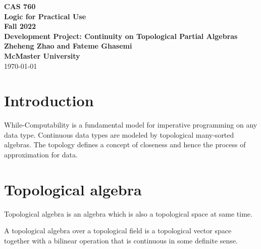 \documentclass[11pt,fleqn]{article}
\begin{document}
\thispagestyle{empty}

\bc
  {\large \textbf{CAS 760}}\\[2mm]
  {\large \textbf{Logic for Practical Use}}\\[2mm]
  {\large \textbf{Fall 2022}}\\[8mm]
  {\huge \textbf{Development Project: Continuity on Topological Partial Algebras}}\\[6mm]
  {\large \textbf{Zheheng Zhao and Fateme Ghasemi }}\\[2mm]
  {\large \textbf{McMaster University}}\\[6mm]
  {\large {\today}}

\ec
\newpage
\tableofcontents
\newpage
\section{Introduction}
While-Computability is a fundamental model for imperative programming on any data type.
Continuous data types are modeled by topological many-sorted algebras.
The topology defines a concept of closeness and hence the process of approximation for data.

\section{Topological algebra}
Topological algebra is an algebra which is also a topological space at same time.

\begin{df}
    A topological algebra over a topological field is a topological vector space together with a bilinear operation that is continuous in some definite sense.
\end{df}
\end{document}
